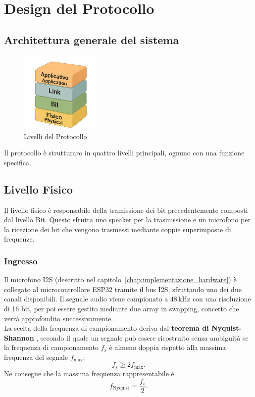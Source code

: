 \chapter{Design del Protocollo}
\label{chap:design_protocollo}
\section{Architettura generale del sistema}
\begin{figure}[H]
    \centering
    \includegraphics[width=0.35\textwidth]{immagini/layers.png}
    \caption{Livelli del Protocollo}
    \label{fig:layers}
\end{figure}
Il protocollo è strutturaro in quattro livelli principali, ognuno con una funzione specifica.
\section{Livello Fisico}
Il livello fisico è responsabile della tramissione dei bit precedentemente composti dal livello Bit.
Questo sfrutta uno speaker per la trasmissione e un microfono per la ricezione dei bit che vengono trasmessi mediante coppie superimposte di frequenze.
\subsection{Ingresso}
Il microfono I2S (descritto nel capitolo~\ref{chap:implementazione_hardware}) è collegato al microcontrollore ESP32 tramite il bus I2S, sfruttando uno dei due canali disponibili.  
Il segnale audio viene campionato a $48\,\text{kHz}$ con una risoluzione di 16 bit, per poi essere gestito mediante due array in swapping, concetto che verrà approfondito successivamente. \\

\noindent
La scelta della frequenza di campionamento deriva dal \textbf{teorema di Nyquist-Shannon} \cite{shannon1949}, secondo il quale un segnale può essere ricostruito senza ambiguità se la frequenza di campionamento $f_s$ è almeno doppia rispetto alla massima frequenza del segnale $f_{\max}$:
\[
f_s \geq 2 f_{\max}.
\]
Ne consegue che la massima frequenza rappresentabile è
\[
f_{\text{Nyquist}} = \frac{f_s}{2}.
\]

